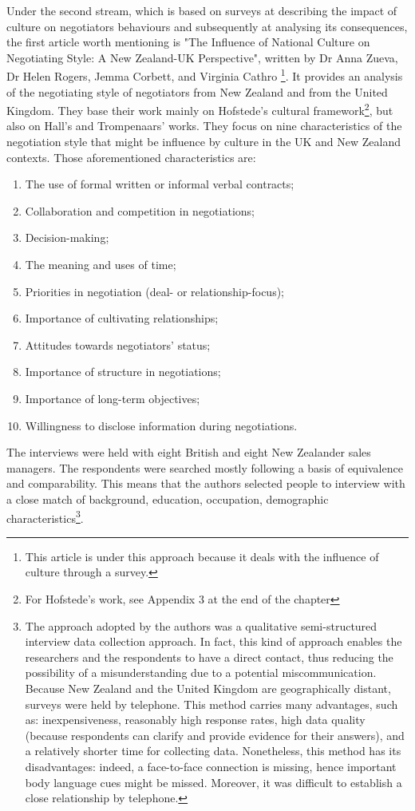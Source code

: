 \documentclass[../main.tex]{subfiles}
\begin{document}
Under the second stream, which is based on surveys at describing the impact of culture on negotiators behaviours and subsequently at analysing its consequences, the first article worth mentioning is "The Influence of National Culture on Negotiating Style: A New Zealand-UK Perspective", written by Dr Anna Zueva, Dr Helen Rogers, Jemma Corbett, and Virginia Cathro \footnote{This article is under this approach because it deals with the influence of culture through a survey.}. It provides an analysis of the negotiating style of negotiators from New Zealand and from the United Kingdom. They base their work mainly on Hofstede’s cultural framework\footnote{For Hofstede's work, see Appendix 3 at the end of the chapter}, but also on Hall's and Trompenaars’ works. They focus on nine characteristics of the negotiation style that might be influence by culture in the UK and New Zealand contexts. Those aforementioned characteristics are:
\begin{enumerate}
    \item The use of formal written or informal verbal contracts;
    \item Collaboration and competition in negotiations;
    \item Decision-making;
    \item The meaning and uses of time;
    \item Priorities in negotiation (deal- or relationship-focus);
    \item Importance of cultivating relationships;
    \item Attitudes towards negotiators’ status;
    \item Importance of structure in negotiations;
    \item Importance of long-term objectives;
    \item Willingness to disclose information during negotiations.
\end{enumerate}

The interviews were held with eight British and eight New Zealander sales managers. The respondents were searched mostly following a basis of equivalence and comparability. This means that the authors selected people to interview with a close match of background, education, occupation, demographic characteristics\footnote{The approach adopted by the authors was a qualitative semi-structured interview data collection approach. In fact, this kind of approach enables the researchers and the respondents to have a direct contact, thus reducing the possibility of a misunderstanding due to a potential miscommunication.
Because New Zealand and the United Kingdom are geographically distant, surveys were held by telephone. This method carries many advantages, such as: inexpensiveness, reasonably high response rates, high data quality (because respondents can clarify and provide evidence for their answers), and a relatively shorter time for collecting data. Nonetheless, this method has its disadvantages: indeed, a face-to-face connection is missing, hence important body language cues might be missed. Moreover, it was difficult to establish a close relationship by telephone.}.
\end{document}
